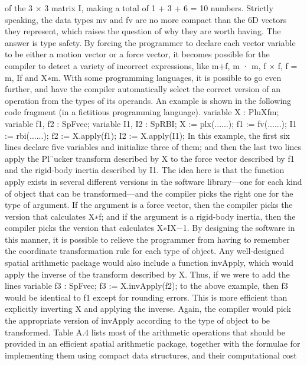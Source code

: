 of the 3 × 3 matrix I, making a total of 1 + 3 + 6 = 10 numbers. Strictly speaking, the data types mv and fv are no more compact than the 6D vectors they represent, which raises the question of why they are worth having. The answer is type safety. By forcing the programmer to declare each vector variable to be either a motion vector or a force vector, it becomes possible for the compiler to detect a variety of incorrect expressions, like m+f, m · m, f × f, f = m, If and X∗m. With some programming languages, it is possible to go even further, and have the compiler automatically select the correct version of an operation from the types of its operands. An example is shown in the following code fragment (in a fictitious programming language). variable X : PluXfm; variable f1, f2 : SpFvec; variable I1, I2 : SpRBI; X := plx(......); f1 := fv(......); I1 := rbi(......); f2 := X.apply(f1); I2 := X.apply(I1); In this example, the first six lines declare five variables and initialize three of them; and then the last two lines apply the Pl¨ucker transform described by X to the force vector described by f1 and the rigid-body inertia described by I1. The idea here is that the function apply exists in several different versions in the software library—one for each kind of object that can be transformed—and the compiler picks the right one for the type of argument. If the argument is a force vector, then the compiler picks the version that calculates X∗f; and if the argument is a rigid-body inertia, then the compiler picks the version that calculates X∗IX−1. By designing the software in this manner, it is possible to relieve the programmer from having to remember the coordinate transformation rule for each type of object. Any well-designed spatial arithmetic package would also include a function invApply, which would apply the inverse of the transform described by X. Thus, if we were to add the lines variable f3 : SpFvec; f3 := X.invApply(f2); to the above example, then f3 would be identical to f1 except for rounding errors. This is more efficient than explicitly inverting X and applying the inverse. Again, the compiler would pick the appropriate version of invApply according to the type of object to be transformed. Table A.4 lists most of the arithmetic operations that should be provided in an efficient spatial arithmetic package, together with the formulae for implementing them using compact data structures, and their computational cost

